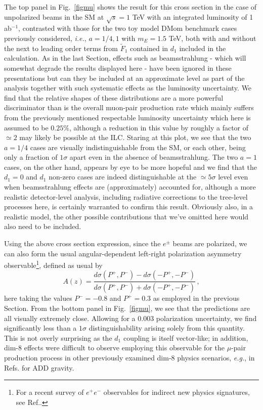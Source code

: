 \documentclass[14pt]{article}
\def\ie{{\it i.e.}}
\def\eg{{\it e.g.}}
\begin{document}
{The top panel in Fig.~\ref{figmu} shows the result for this cross section in the case of unpolarized beams in the SM at $\sqrt s=1$ TeV with an integrated luminosity of 1 ab$^{-1}$, contrasted with those 
for the two toy model DMom benchmark cases previously considered, \ie, $a=1/4,1$ with $m_E=1.5$ TeV, both with and without the next to leading order terms from $\tilde F_1$ contained in $d_1$   
included in the calculation. As in the last Section, effects such as beamsstrahlung - which will somewhat degrade the results displayed here - have been ignored in these presentations but can they 
be included at an approximate level as part of the analysis together with such systematic effects as the luminosity uncertainty. We find that the relative shapes of these distributions are a more powerful 
discriminator than is the overall muon-pair production rate which mainly suffers from the previously mentioned respectable luminosity uncertainty which here is assumed to be $0.25\%$, although a 
reduction in this value by roughly a factor of $\simeq 2$ may likely be possible at the ILC\cite{ILCInternationalDevelopmentTeam:2022izu}. Staring at this plot, we see that the two $a=1/4$ cases are 
visually indistinguishable from the SM, or each other, being only a fraction of $1\sigma$ apart even in the absence of beamsstrahlung. The two $a=1$ cases, on the other hand, appears by eye to be 
more hopeful and we find that the $d_1=0$ and $d_1$ non-zero cases are indeed distinguishable at the $\simeq 5\sigma$ level even when beamsstrahlung effects are (approximately) accounted 
for, although a more realistic detector-level analysis, including radiative corrections to the tree-level processes here, is certainly warranted to confirm this result. Obviously also, in a realistic model, 
the other possible contributions that we've omitted here would also need to be included.

Using the above cross section expression, since the $e^\pm$ beams are polarized,  we can also form the usual angular-dependent left-right polarization asymmetry observable{\footnote {For a recent survey of $e^+e^-$ observables for indirect new physics signatures, see Ref.\cite{Das:2021esm}.}}, defined as usual by 
%
\begin{equation}
A(z)=\frac{d\sigma(P^+,P^-)-d\sigma(-P^+,-P^-)}{d\sigma(P^+,P^-)+d\sigma(-P^+,-P^-)}\,,  
\end{equation}
%
here taking the values $P^-=-0.8$ and $P^+=0.3$ as employed in the previous Section.  From the bottom panel in Fig.~\ref{figmu}, we see that the predictions are all visually extremely close. Allowing for 
a 0.003 polarization uncertainty\cite{ILCInternationalDevelopmentTeam:2022izu}, we find significantly less than a $1\sigma$ distinguishability arising solely from this quantity. This is not overly 
surprising as the $d_1$ 
coupling is itself vector-like; in addition, dim-8 effects were difficult to observe employing this observable for the $\mu$-pair production process in other previously examined dim-8 physics scenarios, \eg, in 
Refs.\cite{Hewett:1998sn,Rizzo:1998fm} for ADD gravity\cite{Arkani-Hamed:1998jmv}.

}
\end{document}
